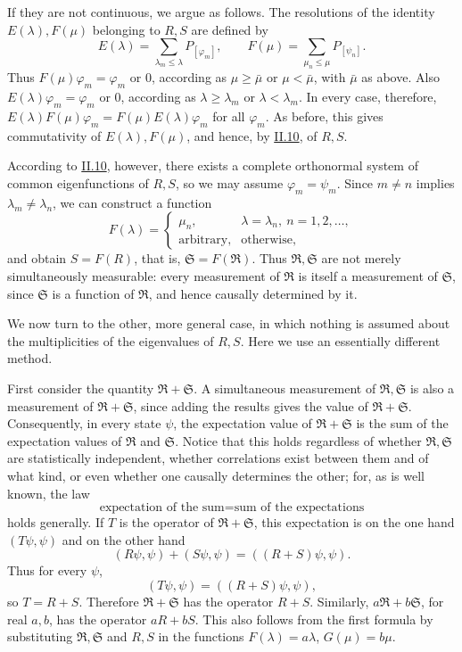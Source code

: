 \documentclass[fontsize=13pt,twoside,openany,headings=normal,parskip=false,bookmarkpackage=false,DIV=calc]{scrbook}
\begin{document}
If they are not continuous, we argue as follows. The resolutions of the identity $E(\lambda),F(\mu)$ belonging to $R,S$ are defined by
\[
E(\lambda)=\sum_{\lambda_m\le\lambda}P_{[\varphi_m]},\qquad
F(\mu)=\sum_{\mu_n\le\mu}P_{[\psi_n]}.
\]
Thus $F(\mu)\varphi_m=\varphi_m$ or $0$, according as $\mu\ge\bar\mu$ or $\mu<\bar\mu$, with $\bar\mu$ as above. Also $E(\lambda)\varphi_m=\varphi_m$ or $0$, according as $\lambda\ge\lambda_m$ or $\lambda<\lambda_m$. In every case, therefore, $E(\lambda)F(\mu)\varphi_m=F(\mu)E(\lambda)\varphi_m$ for all $\varphi_m$. As before, this gives commutativity of $E(\lambda),F(\mu)$, and hence, by \hyperref[sec:II.10]{II.10}, of $R,S$.

According to \hyperref[sec:II.10]{II.10}, however, there exists a complete orthonormal system of common eigenfunctions of $R,S$, so we may assume $\varphi_m=\psi_m$. Since $m\ne n$ implies $\lambda_m\ne\lambda_n$, we can construct a function
\[
F(\lambda)=\begin{cases}\mu_n,&\lambda=\lambda_n,\ n=1,2,\ldots,\\
\text{arbitrary},&\text{otherwise},\end{cases}
\]
and obtain $S=F(R)$, that is, $\mathfrak S=F(\mathfrak R)$. Thus $\mathfrak R,\mathfrak S$ are not merely simultaneously measurable: every measurement of $\mathfrak R$ is itself a measurement of $\mathfrak S$, since $\mathfrak S$ is a function of $\mathfrak R$, and hence causally determined by it.

We now turn to the other, more general case, in which nothing is assumed about the multiplicities of the eigenvalues of $R,S$. Here we use an essentially different method.

First consider the quantity $\mathfrak R+\mathfrak S$. A simultaneous measurement of $\mathfrak R,\mathfrak S$ is also a measurement of $\mathfrak R+\mathfrak S$, since adding the results gives the value of $\mathfrak R+\mathfrak S$. Consequently, in every state $\psi$, the expectation value of $\mathfrak R+\mathfrak S$ is the sum of the expectation values of $\mathfrak R$ and $\mathfrak S$. Notice that this holds regardless of whether $\mathfrak R,\mathfrak S$ are statistically independent, whether correlations exist between them and of what kind, or even whether one causally determines the other; for, as is well known, the law
\[
\text{expectation of the sum}=\text{sum of the expectations}
\]
holds generally. If $T$ is the operator of $\mathfrak R+\mathfrak S$, this expectation is on the one hand $(T\psi,\psi)$ and on the other hand
\[
(R\psi,\psi)+(S\psi,\psi)=((R+S)\psi,\psi).
\]
Thus for every $\psi$,
\[
(T\psi,\psi)=((R+S)\psi,\psi),
\]
so $T=R+S$. Therefore $\mathfrak R+\mathfrak S$ has the operator $R+S$. Similarly, $a\mathfrak R+b\mathfrak S$, for real $a,b$, has the operator $aR+bS$. This also follows from the first formula by substituting $\mathfrak R,\mathfrak S$ and $R,S$ in the functions $F(\lambda)=a\lambda$, $G(\mu)=b\mu$.
\end{document}

